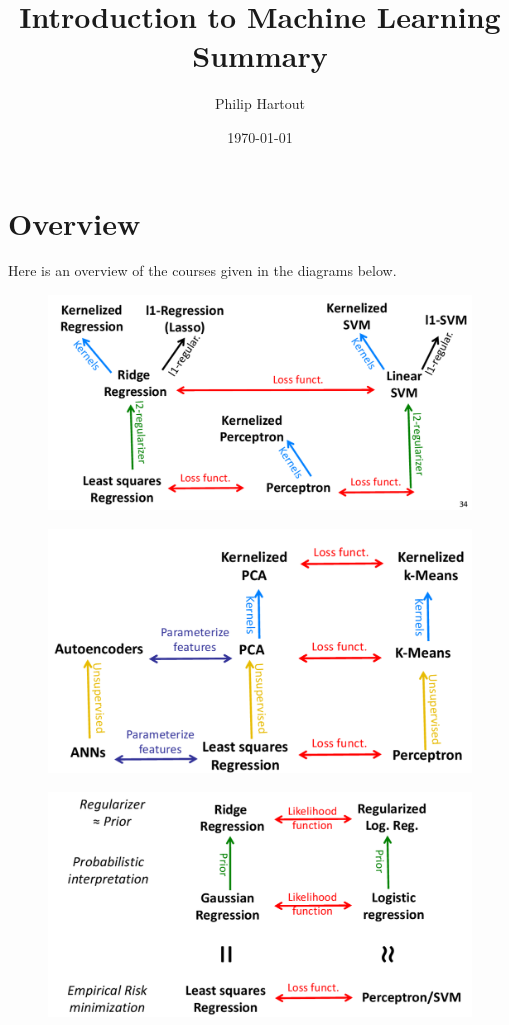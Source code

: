 \documentclass[a4paper,10pt,twoside]{article}
\title{Introduction to Machine Learning \\ Summary}
\author{Philip Hartout}
\date{\today}
\begin{document}
\maketitle

\tableofcontents
\clearpage
\section{Overview}

Here is an overview of the courses given in the diagrams below.

\begin{figure}[H]
  \includegraphics[width=.8\textwidth]{figures/overview_1.png}
\end{figure}
\begin{figure}[H]
  \includegraphics[width=.8\textwidth]{figures/overview_2.png}
\end{figure}
\begin{figure}[H]
  \includegraphics[width=.8\textwidth]{figures/overview_3.png}
\end{figure}
\end{document}
